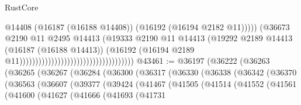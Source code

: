 \begin{lexlean}{RustCore}
\begin{coremodule}
                                                                        @14408
                                                                        (@16187 (@16188 @14408))
                                                                        (@16192
                                                                          (@16194 @2182 @11)))))
                                                                  (@36673
                                                                    @2190
                                                                    @11
                                                                    @2495
                                                                    @14413
                                                                    (@19333
                                                                      @2190
                                                                      @11
                                                                      @14413
                                                                      (@19292
                                                                        @2189
                                                                        @14413
                                                                        (@16187 (@16188 @14413))
                                                                        (@16192
                                                                          (@16194
                                                                            @2189
                                                                            @11))))))))))))))))))))))))))))))))))))
@43461 := @36197
    (@36222
      (@36263
        (@36265
          (@36267
            (@36284
              (@36300
                (@36317
                  (@36330
                    (@36338
                      (@36342
                        (@36370
                          (@36563
                            (@36607
                              (@39377
                                (@39424
                                  (@41467
                                    (@41505
                                      (@41514
                                        (@41552
                                          (@41561
                                            (@41600
                                              (@41627
                                                (@41666
                                                  (@41693
                                                    (@41731

\end{coremodule}
\end{lexlean}
